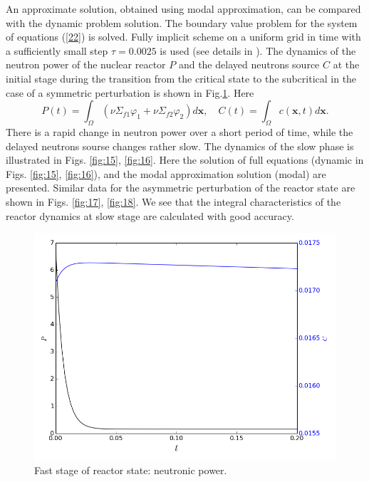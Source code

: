 \documentclass[authoryear]{elsarticle}
\begin{document}
An approximate solution, obtained using modal approximation, can be compared with the dynamic problem solution. The boundary value problem for the system of equations (\ref{22}) is solved. 
Fully implicit scheme on a uniform grid in time with a sufficiently small step $\tau = 0.0025$ is used (see details in
\cite{nd-mm}).
The dynamics of the neutron power of the nuclear reactor $P$ and the delayed neutrons source $C$ 
at the initial stage during the transition from the critical state to the subcritical in the case of a symmetric perturbation is shown in Fig.\ref{fig:14}. 
Here 
\[
 P(t) = \int_{\Omega} (\nu\Sigma_{f1} \varphi_1 + \nu\Sigma_{f2} \varphi_2)  d \bm x,
 \quad C(t) = \int_{\Omega} c(\bm x,t) d \bm x.
\] 
There is a rapid change in neutron power over a short period of time, while the delayed neutrons sourse changes rather slow. The dynamics of the slow phase is illustrated in Figs. \ref{fig:15}, \ref{fig:16}. 
Here the solution of full equations (dynamic in Figs. \ref{fig:15}, \ref{fig:16}),
and the modal approximation solution (modal) are presented. Similar data for the asymmetric perturbation of the reactor state are shown in Figs. \ref{fig:17}, \ref{fig:18}. 
We see that the integral characteristics of the reactor dynamics at slow stage are calculated with good accuracy.

\begin{figure}[!h]
  \begin{center}
    \includegraphics[width=0.9\linewidth] {14.png}
	\caption{Fast stage of reactor state: neutronic power.}
	\label{fig:14}
  \end{center}
\end{figure} 
\end{document}
